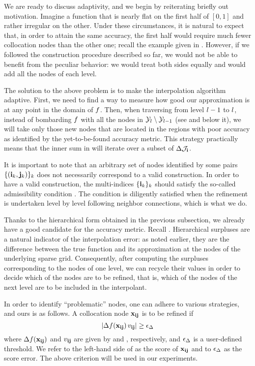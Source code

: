 We are ready to discuss adaptivity, and we begin by reiterating briefly out
motivation. Imagine a function that is nearly flat on the first half of $[0, 1]$
and rather irregular on the other. Under these circumstances, it is natural to
expect that, in order to attain the same accuracy, the first half would require
much fewer collocation nodes than the other one; recall the example given in
. However, if we followed the construction procedure described
so far, we would not be able to benefit from the peculiar behavior: we would
treat both sides equally and would add all the nodes of each level.

The solution to the above problem is to make the interpolation algorithm
adaptive. First, we need to find a way to measure how good our approximation is
at any point in the domain of $f$. Then, when traversing from level $l - 1$ to
$l$, instead of bombarding $f$ with all the nodes in $\mathcal{Y}_l \setminus \mathcal{Y}_{l -
1}$ (see  and below it), we will take only those
new nodes that are located in the regions with poor accuracy as identified by
the yet-to-be-found accuracy metric. This strategy practically means that the
inner sum in  will iterate over a subset of
$\Delta\mathcal{J}_{\mathbf{i}}$.

\begin{remark}
It is important to note that an arbitrary set of nodes identified by some pairs
$\{ (\mathbf{i}_k, \mathbf{j}_k) \}_k$ does not necessarily correspond to a valid
construction. In order to have a valid construction, the multi-indices $\{ \mathbf{i}_k
\}_k$ should satisfy the so-called admissibility condition \cite{klimke2006}.
The condition is diligently satisfied when the refinement is undertaken level
by level following neighbor connections, which is what we do.
\end{remark}

Thanks to the hierarchical form obtained in the previous subsection, we already
have a good candidate for the accuracy metric. Recall .
Hierarchical surpluses are a natural indicator of the interpolation error: as
noted earlier, they are the difference between the true function and its
approximation at the nodes of the underlying sparse grid. Consequently, after
computing the surpluses corresponding to the nodes of one level, we can recycle
their values in order to decide which of the nodes are to be refined, that is,
which of the nodes of the next level are to be included in the interpolant.

In order to identify ``problematic'' nodes, one can adhere to various
strategies, and ours is as follows. A collocation node $\mathbf{x}_{\mathbf{i}\mathbf{j}}$ is to be
refined if
\begin{equation} \elab{serror}
  \left| \surplus(\vx_{\vi\vj}) \, \w_{\vi\vj} \right| \ge \serror
\end{equation}
where $\Delta f(\mathbf{x}_{\mathbf{i}\mathbf{j}})$ and $v_{\mathbf{i}\mathbf{j}}$ are given by  and
, respectively, and $\epsilon_\Delta$ is a user-defined threshold. We refer
to the left-hand side of  as the score of $\mathbf{x}_{\mathbf{i}\mathbf{j}}$ and to
$\epsilon_\Delta$ as the score error. The above criterion will be used in our
experiments.

